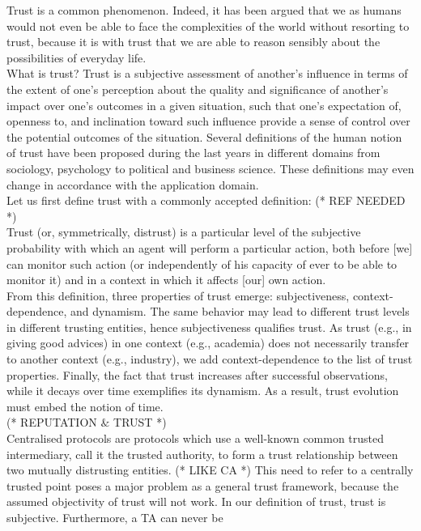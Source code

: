 \documentclass{article}
\begin{document}
Trust is a common phenomenon. Indeed, it has been argued that we as humans would not even be able to face the complexities of the world without resorting
to trust, because it is with trust that we are able to reason sensibly about the possibilities of everyday life.\\
What is trust? Trust is a subjective assessment of another{'}s influence in terms of the extent of one{'}s perception about the quality and significance
of another{'}s impact over one{'}s outcomes in a given situation, such that one{'}s expectation of, openness to, and inclination toward such influence
provide a sense of control over the potential outcomes of the situation. Several definitions of the human notion of trust have been proposed during
the last years in different domains from sociology, psychology to political and business science. These definitions may even change in accordance
with the application domain.\\
Let us first define trust with a commonly accepted definition: (* REF NEEDED *)\\
Trust (or, symmetrically, distrust) is a particular level of the subjective probability with which an agent will perform a particular action, both
before [we] can monitor such action (or independently of his capacity of ever to be able to monitor it) and in a context in which it affects [our]
own action.\\
From this definition, three properties of trust emerge: subjectiveness, context-dependence, and dynamism. The same behavior may lead to different
trust levels in different trusting entities, hence subjectiveness qualifies trust. As trust (e.g., in giving good advices) in one context (e.g.,
academia) does not necessarily transfer to another context (e.g., industry), we add context-dependence to the list of trust properties. Finally,
the fact that trust increases after successful observations, while it decays over time exemplifies its dynamism. As a result, trust evolution must
embed the notion of time.\\
(* REPUTATION $\&$ TRUST *)\\
Centralised protocols are protocols which use a well-known common trusted intermediary, call it the trusted authority, to form a trust relationship
between two mutually distrusting entities. (* LIKE CA *) This need to refer to a centrally trusted point poses a major problem as a general trust
framework, because the assumed objectivity of trust will not work. In our definition of trust, trust is subjective. Furthermore, a TA can never be
\end{document}
